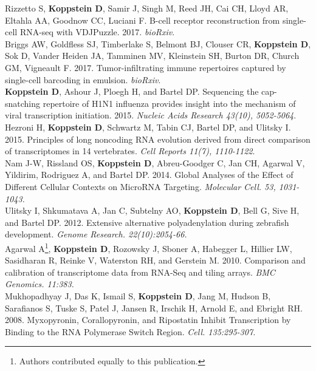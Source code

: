 \documentclass[10pt,a4paper]{article}
\begin{document}
{\noindent Rizzetto S, \textbf{Koppstein D}, Samir J, Singh M, Reed JH, Cai CH, Lloyd AR, Eltahla AA, Goodnow CC, Luciani F. B-cell receptor reconstruction from single-cell RNA-seq with VDJPuzzle. 2017. \textit{bioRxiv}. \vspace{0.5em} \\
{\noindent Briggs AW, Goldfless SJ, Timberlake S, Belmont BJ, Clouser CR, \textbf{Koppstein D}, Sok D, Vander Heiden JA, Tamminen MV, Kleinstein SH, Burton DR, Church GM, Vigneault F. 2017. Tumor-infiltrating immune repertoires captured by single-cell barcoding in emulsion. \textit{bioRxiv}. \\
{\noindent \textbf{Koppstein D}, Ashour J, Ploegh H, and Bartel DP. Sequencing the cap-snatching repertoire of H1N1
influenza provides insight into the mechanism of viral transcription initiation. 2015. \textit{Nucleic Acids Research 43(10), 5052-5064}.} \\
{\noindent Hezroni H, \textbf{Koppstein D}, Schwartz M, Tabin CJ, Bartel DP, and Ulitsky I. 2015. Principles of long noncoding
RNA evolution derived from direct comparison of transcriptomes in 14 vertebrates. \textit{Cell Reports 11(7), 1110-1122}}. \vspace{0.2em} \\
{\noindent Nam J-W, Rissland OS, \textbf{Koppstein D}, Abreu-Goodger C, Jan CH, Agarwal V, Yildirim, Rodriguez A, and Bartel DP. 2014. Global Analyses of the Effect of Different Cellular Contexts on MicroRNA Targeting. \textit{Molecular Cell. 53, 1031-1043.}} \vspace{0.2em} \\
{\noindent Ulitsky I, Shkumatava A, Jan C, Subtelny AO, \textbf{Koppstein D}, Bell G, Sive H, and Bartel DP. 2012. Extensive alternative polyadenylation during zebrafish development. \textit{Genome Research. 22(10):2054-66.}} \vspace{0.3em} \\
{\noindent Agarwal A\footnote[1]{Authors contributed equally to this publication.}, \textbf{Koppstein D}\footnotemark[1], Rozowsky J, Sboner A, Habegger L, Hillier LW, Sasidharan R, Reinke V, Waterston RH, and Gerstein M. 2010. Comparison and calibration of transcriptome data from RNA-Seq and tiling arrays. \textit{BMC Genomics. 11:383.}} \vspace{0.3em} \\
{\noindent Mukhopadhyay J, Das K, Ismail S, \textbf{Koppstein D}, Jang M, Hudson B, Sarafianos S, Tuske S, Patel J, Jansen R, Irschik H, Arnold E, and Ebright RH. 2008. Myxopyronin, Corallopyronin, and Ripostatin Inhibit Transcription by Binding to the RNA Polymerase Switch Region. \textit{Cell. 135:295-307.}} \vspace{0.3em} \\

}}
\end{document}
